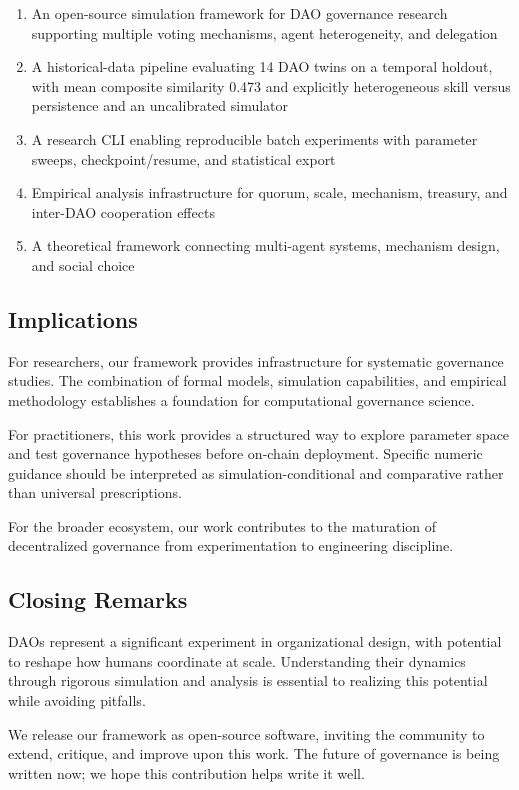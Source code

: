 \begin{enumerate}
    \item An open-source simulation framework for DAO governance research supporting multiple voting mechanisms, agent heterogeneity, and delegation
    \item A historical-data pipeline evaluating 14 DAO twins on a temporal holdout, with mean composite similarity 0.473 and explicitly heterogeneous skill versus persistence and an uncalibrated simulator
    \item A research CLI enabling reproducible batch experiments with parameter sweeps, checkpoint/resume, and statistical export
    \item Empirical analysis infrastructure for quorum, scale, mechanism, treasury, and inter-DAO cooperation effects
    \item A theoretical framework connecting multi-agent systems, mechanism design, and social choice
\end{enumerate}

\subsection{Implications}

For researchers, our framework provides infrastructure for systematic governance studies. The combination of formal models, simulation capabilities, and empirical methodology establishes a foundation for computational governance science.

For practitioners, this work provides a structured way to explore parameter space and test governance hypotheses before on-chain deployment. Specific numeric guidance should be interpreted as simulation-conditional and comparative rather than universal prescriptions.

For the broader ecosystem, our work contributes to the maturation of decentralized governance from experimentation to engineering discipline.

\subsection{Closing Remarks}

DAOs represent a significant experiment in organizational design, with potential to reshape how humans coordinate at scale. Understanding their dynamics through rigorous simulation and analysis is essential to realizing this potential while avoiding pitfalls.

We release our framework as open-source software, inviting the community to extend, critique, and improve upon this work. The future of governance is being written now; we hope this contribution helps write it well.

